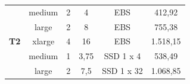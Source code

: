 \begin{table}
\begin{center}
\begin{tabular}{cccccc}
\multicolumn{1}{|c|}{\cellcolor[HTML]{EFEFEF}}                              & \multicolumn{1}{c|}{medium}                                  & \multicolumn{1}{c|}{2}                                    & \multicolumn{1}{c|}{4}                                                                                      & \multicolumn{1}{c|}{EBS}                                                                                          & \multicolumn{1}{c|}{412,92}                                                                             \\ \cline{2-6} 
\multicolumn{1}{|c|}{\cellcolor[HTML]{EFEFEF}}                              & \multicolumn{1}{c|}{large}                                   & \multicolumn{1}{c|}{2}                                    & \multicolumn{1}{c|}{8}                                                                                      & \multicolumn{1}{c|}{EBS}                                                                                          & \multicolumn{1}{c|}{755,38}                                                                             \\ \cline{2-6} 
\multicolumn{1}{|c|}{\multirow{-5}{*}{\cellcolor[HTML]{EFEFEF}\textbf{T2}}} & \multicolumn{1}{c|}{xlarge}                                  & \multicolumn{1}{c|}{4}                                    & \multicolumn{1}{c|}{16}                                                                                     & \multicolumn{1}{c|}{EBS}                                                                                          & \multicolumn{1}{c|}{1.518,15}                                                                           \\ \hline
\multicolumn{1}{|c|}{\cellcolor[HTML]{EFEFEF}}                              & \multicolumn{1}{c|}{medium}                                  & \multicolumn{1}{c|}{1}                                    & \multicolumn{1}{c|}{3,75}                                                                                   & \multicolumn{1}{c|}{SSD 1 x 4}                                                                                        & \multicolumn{1}{c|}{538,49}                                                                             \\ \cline{2-6} 
\multicolumn{1}{|c|}{\cellcolor[HTML]{EFEFEF}}                              & \multicolumn{1}{c|}{large}                                   & \multicolumn{1}{c|}{2}                                    & \multicolumn{1}{c|}{7,5}                                                                                    & \multicolumn{1}{c|}{SSD 1 x 32}                                                                                       & \multicolumn{1}{c|}{1.068,85}                                                                           \\ \cline{2-6} 

\end{tabular}
\end{center}
\end{table}

